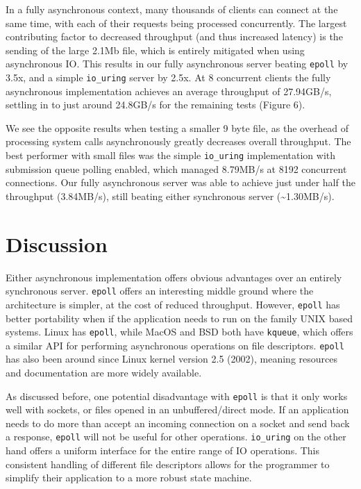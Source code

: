 \documentclass[letterpaper, 10pt, twocolumn]{article}
\begin{document}
In a fully asynchronous context, many thousands of clients can connect at the same time, with each of their requests being processed concurrently. The largest contributing factor to decreased throughput (and thus increased latency) is the sending of the large 2.1Mb file, which is entirely mitigated when using asynchronous IO. This results in our fully asynchronous server beating \texttt{epoll} by 3.5x, and a simple \texttt{io\_uring} server by 2.5x. At 8 concurrent clients the fully asynchronous implementation achieves an average throughput of 27.94GB/s, settling in to just around 24.8GB/s for the remaining tests (Figure 6).

We see the opposite results when testing a smaller 9 byte file, as the overhead of processing system calls asynchronously greatly decreases overall throughput. The best performer with small files was the simple \texttt{io\_uring} implementation with submission queue polling enabled, which managed 8.79MB/s at 8192 concurrent connections. Our fully asynchronous server was able to achieve just under half the throughput (3.84MB/s), still beating either synchronous server (\textasciitilde{}1.30MB/s).
\section{Discussion}
\label{sec:orgd5db148}
Either asynchronous implementation offers obvious advantages over an entirely synchronous server. \texttt{epoll} offers an interesting middle ground where the architecture is simpler, at the cost of reduced throughput. However, \texttt{epoll} has better portability when if the application needs to run on the family UNIX based systems. Linux has \texttt{epoll}, while MacOS and BSD both have \texttt{kqueue}, which offers a similar API for performing asynchronous operations on file descriptors. \texttt{epoll} has also been around since Linux kernel version 2.5 (2002), meaning resources and documentation are more widely available.

As discussed before, one potential disadvantage with \texttt{epoll} is that it only works well with sockets, or files opened in an unbuffered/direct mode. If an application needs to do more than accept an incoming connection on a socket and send back a response, \texttt{epoll} will not be useful for other operations. \texttt{io\_uring} on the other hand offers a uniform interface for the entire range of IO operations. This consistent handling of different file descriptors allows for the programmer to simplify their application to a more robust state machine.
\end{document}
